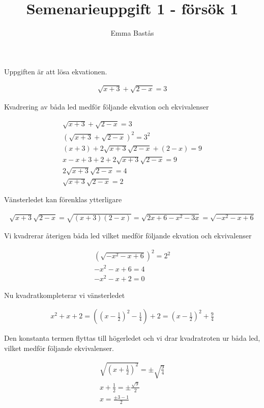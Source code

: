 \documentclass{article}
\title{Semenarieuppgift 1 - försök 1}
\author{Emma Bastås}
\begin{document}
\maketitle

Uppgiften är att lösa ekvationen.

\begin{gather*}
  \sqrt{x + 3} + \sqrt{2 - x} = 3 \label{ekv:0}\tag{0}
\end{gather*}

Kvadrering av båda led medför följande ekvation och ekvivalenser

\begin{gather*}
  \sqrt{x + 3} + \sqrt{2 - x} = 3                      \\
  (\sqrt{x + 3} + \sqrt{2 - x})^{2} = 3^{2}             \\
  (x + 3) + 2\sqrt{x + 3}\sqrt{2 - x} + (2 - x) = 9    \\
  x - x + 3 + 2 + 2\sqrt{x + 3}\sqrt{2 - x} = 9        \\
  2\sqrt{x + 3}\sqrt{2 - x} = 4                        \\
  \sqrt{x + 3}\sqrt{2 - x} = 2                  \label{ekv:1}\tag{1}
\end{gather*}

Vänsterledet kan förenklas ytterligare

\begin{gather*}
  \sqrt{x + 3}\sqrt{2 - x} = \sqrt{(x + 3)(2 - x)} = \sqrt{2x + 6 - x^{2} - 3x} = \sqrt{-x^{2} - x + 6}
\end{gather*}

Vi kvadrerar återigen båda led vilket medför följande ekvation och ekvivalenser

\begin{gather*}
  (\sqrt{-x^{2} - x + 6})^{2} = 2^{2} \\
  -x^{2} - x + 6 = 4 \\
  -x^{2} - x + 2 = 0    \label{ekv:2}\tag{2}
\end{gather*}

Nu kvadratkompleterar vi vänsterledet

\begin{gather*}
  x^{2} + x + 2 = ((x - \frac{1}{2})^{2} - \frac{1}{4}) + 2 = (x - \frac{1}{2})^{2} + \frac{9}{4}
\end{gather*}

Den konstanta termen flyttas till högerledet och vi drar kvadratroten ur båda led, vilket medför följande ekvivalenser.

\begin{gather*}
  \sqrt{(x + \frac{1}{2})^{2}} = \pm \sqrt{\frac{9}{4}} \\
  x + \frac{1}{2} = \pm \frac{\sqrt{9}}{2}\\
  x = \frac{\pm 3 - 1}{2}        \label{ekv:3}\tag{3}
\end{gather*}
\end{document}
